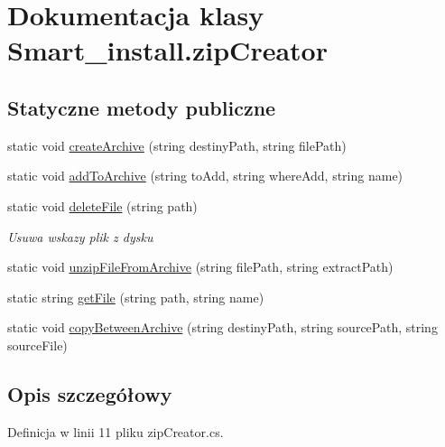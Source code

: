 \hypertarget{class_smart__install_1_1zip_creator}{\section{Dokumentacja klasy Smart\+\_\+install.\+zip\+Creator}
\label{class_smart__install_1_1zip_creator}
}
\subsection*{Statyczne metody publiczne}
\begin{DoxyCompactItemize}
\item 
static void \hyperlink{class_smart__install_1_1zip_creator_ada007dd010892ba93dcfd65b65837669}{create\+Archive} (string destiny\+Path, string file\+Path)
\item 
static void \hyperlink{class_smart__install_1_1zip_creator_ad35072421dbf133168925d86702301e8}{add\+To\+Archive} (string to\+Add, string where\+Add, string name)
\item 
static void \hyperlink{class_smart__install_1_1zip_creator_a4f4fa6e6b2fe6ab6ddd4333778413ae3}{delete\+File} (string path)
\begin{DoxyCompactList}\small\item\em Usuwa wskazy plik z dysku \end{DoxyCompactList}\item 
static void \hyperlink{class_smart__install_1_1zip_creator_ab73cd9a014551fe63502f9e87e2d0bc5}{unzip\+File\+From\+Archive} (string file\+Path, string extract\+Path)
\item 
static string \hyperlink{class_smart__install_1_1zip_creator_a5dc6db46d832a7059272b8f81ef9df79}{get\+File} (string path, string name)
\item 
static void \hyperlink{class_smart__install_1_1zip_creator_ac6c7d6f4c0c0831a788c6cbd6ddd866c}{copy\+Between\+Archive} (string destiny\+Path, string source\+Path, string source\+File)
\end{DoxyCompactItemize}


\subsection{Opis szczegółowy}


Definicja w linii 11 pliku zip\+Creator.\+cs.




